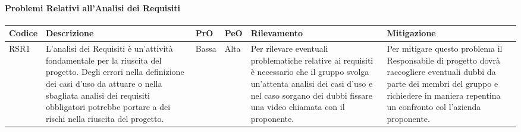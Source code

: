 \paragraph{Problemi Relativi all'Analisi dei Requisiti}
\begin{center}

	\begin{longtable}{p{1cm}|p{4cm}|p{0.7cm}|p{0.7cm}|p{3cm}|p{4cm}}
		\arrayrulecolor{white}
		\hline
		\rowcolor{blue!20}
		\textbf{Codice} & 
		\textbf{Descrizione} &
		\textbf{PrO}  &
		\textbf{PeO}  &				        
		\textbf{Rilevamento} &
		\textbf{Mitigazione} \\
		\hline	
		RSR1 & L'analisi dei Requisiti è un'attività fondamentale per la riuscita del progetto. Degli errori nella definizione dei casi d'uso da attuare o nella sbagliata analisi dei requisiti obbligatori potrebbe portare a dei rischi nella riuscita del progetto. & Bassa & Alta & Per rilevare eventuali problematiche relative ai requisiti è necessario che il gruppo svolga un'attenta analisi dei casi d'uso e nel caso sorgano dei dubbi fissare una video chiamata con il proponente. & Per mitigare questo problema il Responsabile di progetto dovrà raccogliere eventuali dubbi da parte dei membri del gruppo e richiedere in maniera repentina un confronto col l'azienda proponente. \\
	\end{longtable}
\end{center}